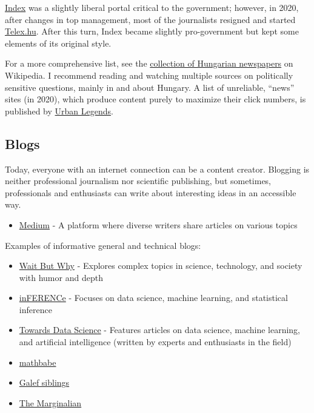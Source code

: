 \documentclass{article}
\begin{document}
\href{https://index.hu/}{Index} was a slightly liberal portal critical to the government; however, in 2020, after changes in top management, most of the journalists resigned and started \href{https://telex.hu/}{Telex.hu}. After this turn, Index became slightly pro-government but kept some elements of its original style.

For a more comprehensive list, see the \href{https://en.wikipedia.org/wiki/List_of_newspapers_in_Hungary}{collection of Hungarian newspapers} on Wikipedia.
I recommend reading and watching multiple sources on politically sensitive questions, mainly in and about Hungary.
A list of unreliable, ``news'' sites (in 2020), which produce content purely to maximize their click numbers, is published by \href{https://www.urbanlegends.hu/2020/01/megteveszto-magyar-hiroldalak-listaja-2020/}{Urban Legends}.

\subsection{Blogs}

Today, everyone with an internet connection can be a content creator. Blogging is neither professional journalism nor scientific publishing, but sometimes, professionals and enthusiasts can write about interesting ideas in an accessible way. 

\begin{itemize}
    \item \href{https://medium.com/}{Medium} - A platform where diverse writers share articles on various topics
\end{itemize}

Examples of informative general and technical blogs:

\begin{itemize}
    \item \href{https://waitbutwhy.com/}{Wait But Why} - Explores complex topics in science, technology, and society with humor and depth
    \item \href{https://www.inference.vc/}{inFERENCe} - Focuses on data science, machine learning, and statistical inference
    \item \href{https://towardsdatascience.com/}{Towards Data Science} - Features articles on data science, machine learning, and artificial intelligence (written by experts and enthusiasts in the field)
    \item \href{https://mathbabe.org/}{mathbabe}
    \item \href{https://jessegalef.com/}{Galef siblings}
    \item \href{https://www.themarginalian.org/}{The Marginalian}
\end{itemize}
\end{document}
